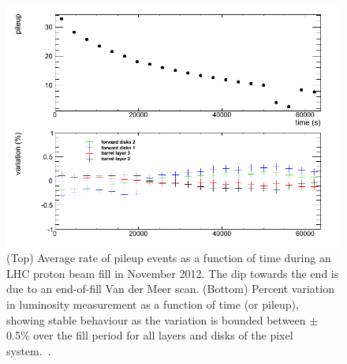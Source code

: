 \begin{figure}[hbtp]
  \begin{center}
    \includegraphics[width=1.5\cmsFigWidth]{figures/cms-lumipileup}
    \caption{(Top) Average rate of pileup events as a function of time during an LHC proton beam fill in November 2012. The dip towards the end is due to an end-of-fill Van der Meer scan. (Bottom) Percent variation in luminosity measurement as a function of time (or pileup), showing stable behaviour as the variation is bounded between $\pm$0.5\% over the fill period for all layers and disks of the pixel system.~\cite{CMS-total-lumi}.}
    \label{fig:cms-lumipileup}
  \end{center}
\end{figure}